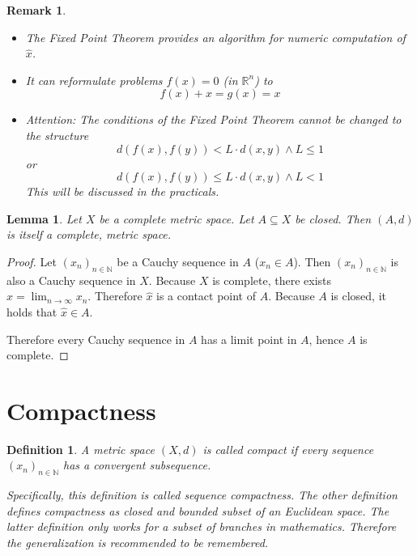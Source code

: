 \documentclass{article}
\newtheorem{definition}{Definition}  \numberwithin{definition}{section}
\newtheorem{lemma}{Lemma}  \numberwithin{lemma}{section}
\newtheorem{remark}{Remark}  \numberwithin{remark}{section}
\begin{document}
\begin{remark}
  \begin{itemize}
  	\item The Fixed Point Theorem provides an algorithm for numeric computation of $\hat{x}$.
    \item It can reformulate problems $f(x) = 0$ (in $\mathbb R^n$) to
      \[ f(x) + x = g(x) = x \]
    \item Attention: The conditions of the Fixed Point Theorem cannot be changed to the structure
      \[ d(f(x), f(y)) < L \cdot d(x, y) \land L \leq 1 \]
      or
      \[ d(f(x), f(y)) \leq L \cdot d(x, y) \land L < 1 \]
      This will be discussed in the practicals.
  \end{itemize}
\end{remark}

\begin{lemma} %
  \label{lemma7}
  Let $X$ be a complete metric space. Let $A \subseteq X$ be closed.
  Then $(A, d)$ is itself a complete, metric space.
\end{lemma}

\begin{proof}
  Let $(x_n)_{n \in \mathbb N}$ be a Cauchy sequence in $A$ ($x_n \in A$).
  Then $(x_n)_{n \in \mathbb N}$ is also a Cauchy sequence in $X$.
  Because $X$ is complete, there exists $\hat{x} = \lim_{n\to\infty} x_n$.
  Therefore $\hat{x}$ is a contact point of $A$.
  Because $A$ is closed, it holds that $\hat{x} \in A$.

  Therefore every Cauchy sequence in $A$ has a limit point in $A$,
  hence $A$ is complete.
\end{proof}

\section{Compactness}

\begin{definition} %
  A metric space $(X, d)$ is called \emph{compact} if every sequence $(x_n)_{n \in \mathbb N}$
  has a convergent subsequence.

  Specifically, this definition is called sequence compactness. The other definition defines compactness as closed and bounded subset of an Euclidean space. The latter definition only works for a subset of branches in mathematics. Therefore the generalization is recommended to be remembered.
\end{definition}
\end{document}
